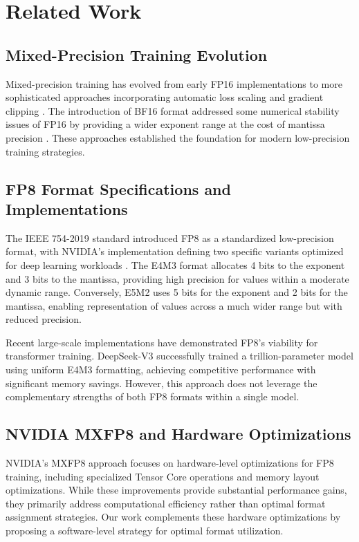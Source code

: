 \documentclass[conference]{IEEEtran}
\begin{document}
\section{Related Work}

\subsection{Mixed-Precision Training Evolution}

Mixed-precision training has evolved from early FP16 implementations \cite{narang2017mixed} to more sophisticated approaches incorporating automatic loss scaling and gradient clipping \cite{micikevicius2018mixed}. The introduction of BF16 format addressed some numerical stability issues of FP16 by providing a wider exponent range at the cost of mantissa precision \cite{kalamkar2019study}. These approaches established the foundation for modern low-precision training strategies.

\subsection{FP8 Format Specifications and Implementations}

The IEEE 754-2019 standard introduced FP8 as a standardized low-precision format, with NVIDIA's implementation defining two specific variants optimized for deep learning workloads \cite{micikevicius2022fp8formatsdeeplearning}. The E4M3 format allocates 4 bits to the exponent and 3 bits to the mantissa, providing high precision for values within a moderate dynamic range. Conversely, E5M2 uses 5 bits for the exponent and 2 bits for the mantissa, enabling representation of values across a much wider range but with reduced precision.

Recent large-scale implementations have demonstrated FP8's viability for transformer training. DeepSeek-V3 \cite{deepseekv3} successfully trained a trillion-parameter model using uniform E4M3 formatting, achieving competitive performance with significant memory savings. However, this approach does not leverage the complementary strengths of both FP8 formats within a single model.

\subsection{NVIDIA MXFP8 and Hardware Optimizations}

NVIDIA's MXFP8 approach \cite{nvidia2024mxfp8} focuses on hardware-level optimizations for FP8 training, including specialized Tensor Core operations and memory layout optimizations. While these improvements provide substantial performance gains, they primarily address computational efficiency rather than optimal format assignment strategies. Our work complements these hardware optimizations by proposing a software-level strategy for optimal format utilization.
\end{document}
